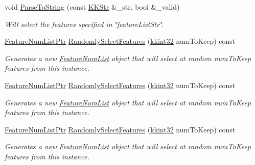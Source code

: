 \begin{DoxyCompactItemize}
void \hyperlink{class_k_k_m_l_l_1_1_feature_num_list_a7cb87eaf9d3ae1a492e9106f3d69897c}{Parse\+To\+String} (const \hyperlink{class_k_k_b_1_1_k_k_str}{K\+K\+Str} \&\+\_\+str, bool \&\+\_\+valid)
\begin{DoxyCompactList}\small\item\em Will select the features specified in \char`\"{}feature\+List\+Str\char`\"{}. \end{DoxyCompactList}\item 
\hyperlink{class_k_k_m_l_l_1_1_feature_num_list_a8c7e53951a6f552a3f5e45c599ef05be}{Feature\+Num\+List\+Ptr} \hyperlink{class_k_k_m_l_l_1_1_feature_num_list_a2a930390caf76a9651bff2cfb77e37aa}{Randomly\+Select\+Features} (\hyperlink{namespace_k_k_b_a8fa4952cc84fda1de4bec1fbdd8d5b1b}{kkint32} num\+To\+Keep) const 
\begin{DoxyCompactList}\small\item\em Generates a new \hyperlink{class_k_k_m_l_l_1_1_feature_num_list}{Feature\+Num\+List} object that will select at random \textquotesingle{}num\+To\+Keep\textquotesingle{} features from this instance. \end{DoxyCompactList}\item 
\hyperlink{class_k_k_m_l_l_1_1_feature_num_list_a8c7e53951a6f552a3f5e45c599ef05be}{Feature\+Num\+List\+Ptr} \hyperlink{class_k_k_m_l_l_1_1_feature_num_list_ab60ff69676b7038f0cd6113bae79e3b5}{Randomly\+Select\+Features} (\hyperlink{namespace_k_k_b_a8fa4952cc84fda1de4bec1fbdd8d5b1b}{kkint32} num\+To\+Keep) const 
\begin{DoxyCompactList}\small\item\em Generates a new \hyperlink{class_k_k_m_l_l_1_1_feature_num_list}{Feature\+Num\+List} object that will select at random \textquotesingle{}num\+To\+Keep\textquotesingle{} features from this instance. \end{DoxyCompactList}\item 
\hyperlink{class_k_k_m_l_l_1_1_feature_num_list_a8c7e53951a6f552a3f5e45c599ef05be}{Feature\+Num\+List\+Ptr} \hyperlink{class_k_k_m_l_l_1_1_feature_num_list_a2a930390caf76a9651bff2cfb77e37aa}{Randomly\+Select\+Features} (\hyperlink{namespace_k_k_b_a8fa4952cc84fda1de4bec1fbdd8d5b1b}{kkint32} num\+To\+Keep) const 
\begin{DoxyCompactList}\small\item\em Generates a new \hyperlink{class_k_k_m_l_l_1_1_feature_num_list}{Feature\+Num\+List} object that will select at random \textquotesingle{}num\+To\+Keep\textquotesingle{} features from this instance. \end{DoxyCompactList}\item 

\end{DoxyCompactItemize}
